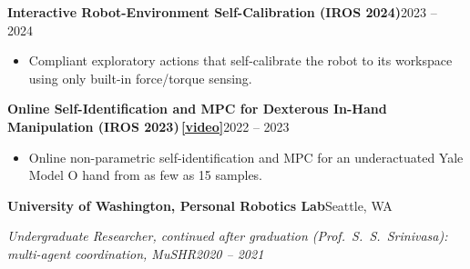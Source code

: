 \documentclass[10pt,letterpaper]{article}
\newcommand{\entry}[2]{\textbf{#1}\hfill #2\par}
\newcommand{\subentry}[2]{\textit{#1}\hfill\textit{#2}\par\vspace{1pt}}
\newcommand{\project}[2]{\vspace{3pt}\textbf{\color{accent!70!black}#1}\hfill{\small #2}\par}
\newcommand{\videolink}[1]{\,{\small\href{#1}{\color{accent}[video]}}}
\begin{document}
\project{Interactive Robot-Environment Self-Calibration (IROS 2024)}{2023 -- 2024}
\begin{itemize}
  \item Compliant exploratory actions that self-calibrate the robot to its workspace using only built-in force/torque sensing.
\end{itemize}

\project{Online Self-Identification and MPC for Dexterous In-Hand Manipulation (IROS 2023)\videolink{https://www.youtube.com/watch?v=4FQ2193q1kk}}{2022 -- 2023}
\begin{itemize}
  \item Online non-parametric self-identification and MPC for an underactuated Yale Model O hand from as few as 15 samples.
\end{itemize}

\vspace{2pt}
\entry{University of Washington, Personal Robotics Lab}{Seattle, WA}
\subentry{Undergraduate Researcher, continued after graduation (Prof.\ S.\ S.\ Srinivasa): multi-agent coordination, MuSHR}{2020 -- 2021}

\end{document}
